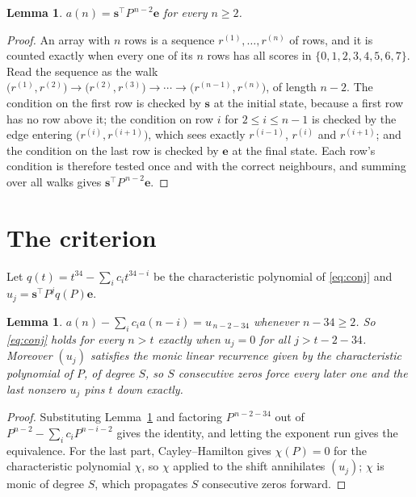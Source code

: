 \documentclass[11pt,a4paper]{article}
\theoremstyle{plain}
\newtheorem{lemma}[theorem]{Lemma}
\theoremstyle{definition}
\begin{document}
\begin{lemma}\label{lem:walk}
$a(n)=\mathbf{s}^{\!\top}P^{\,n-2}\mathbf{e}$ for every $n\ge2$.
\end{lemma}

\begin{proof}
An array with $n$ rows is a sequence $r^{(1)},\dots,r^{(n)}$ of rows, and it is counted
exactly when every one of its $n$ rows has all scores in $\{0,1,2,3,4,5,6,7\}$. Read the sequence as the
walk $\bigl(r^{(1)},r^{(2)}\bigr)\to\bigl(r^{(2)},r^{(3)}\bigr)\to\cdots\to
\bigl(r^{(n-1)},r^{(n)}\bigr)$, of length $n-2$. The condition on the first row is
checked by $\mathbf{s}$ at the initial state, because a first row has no row above it; the
condition on row $i$ for $2\le i\le n-1$ is checked by the edge entering
$\bigl(r^{(i)},r^{(i+1)}\bigr)$, which sees exactly $r^{(i-1)}$, $r^{(i)}$ and
$r^{(i+1)}$; and the condition on the last row is checked by $\mathbf{e}$ at the final
state. Each row's condition is therefore tested once and with the correct neighbours, and
summing over all walks gives $\mathbf{s}^{\!\top}P^{\,n-2}\mathbf{e}$.
\end{proof}

\section{The criterion}

Let $q(t)=t^{34}-\sum_i c_i t^{34-i}$ be the characteristic polynomial of
\eqref{eq:conj} and $u_j=\mathbf{s}^{\!\top}P^{j}q(P)\mathbf{e}$.

\begin{lemma}\label{lem:crit}
$a(n)-\sum_i c_i a(n-i)=u_{\,n-2-34}$ whenever $n-34\ge2$. So \eqref{eq:conj}
holds for every $n>t$ exactly when $u_j=0$ for all $j>t-2-34$. Moreover $(u_j)$
satisfies the monic linear recurrence given by the characteristic polynomial of $P$, of
degree $S$, so $S$ consecutive zeros force every later one and the last nonzero $u_j$ pins
$t$ down exactly.
\end{lemma}

\begin{proof}
Substituting Lemma~\ref{lem:walk} and factoring $P^{\,n-2-34}$ out of
$P^{n-2}-\sum_i c_i P^{n-i-2}$ gives the identity, and letting the exponent run gives the
equivalence. For the last part, Cayley--Hamilton gives $\chi(P)=0$ for the characteristic
polynomial $\chi$, so $\chi$ applied to the shift annihilates $(u_j)$; $\chi$ is monic of
degree $S$, which propagates $S$ consecutive zeros forward.
\end{proof}
\end{document}
